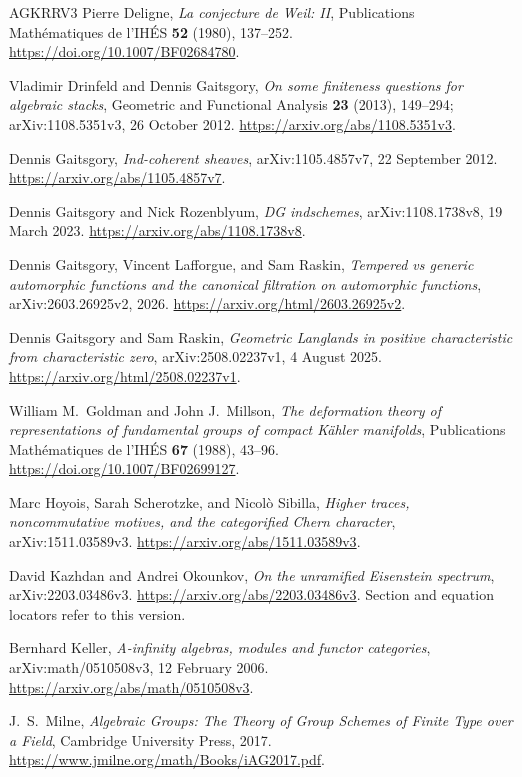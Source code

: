 \begin{thebibliography}{AGKRRV3}
Pierre Deligne,
\emph{La conjecture de Weil: II},
Publications Math\'ematiques de l'IH\'ES \textbf{52} (1980), 137--252.
\url{https://doi.org/10.1007/BF02684780}.


Vladimir Drinfeld and Dennis Gaitsgory,
\emph{On some finiteness questions for algebraic stacks},
Geometric and Functional Analysis \textbf{23} (2013), 149--294;
arXiv:1108.5351v3, 26 October 2012.
\url{https://arxiv.org/abs/1108.5351v3}.

Dennis Gaitsgory,
\emph{Ind-coherent sheaves},
arXiv:1105.4857v7, 22 September 2012.
\url{https://arxiv.org/abs/1105.4857v7}.

Dennis Gaitsgory and Nick Rozenblyum,
\emph{DG indschemes},
arXiv:1108.1738v8, 19 March 2023.
\url{https://arxiv.org/abs/1108.1738v8}.

Dennis Gaitsgory, Vincent Lafforgue, and Sam Raskin,
\emph{Tempered vs generic automorphic functions and the canonical
filtration on automorphic functions},
arXiv:2603.26925v2, 2026.
\url{https://arxiv.org/html/2603.26925v2}.

Dennis Gaitsgory and Sam Raskin,
\emph{Geometric Langlands in positive characteristic from characteristic zero},
arXiv:2508.02237v1, 4 August 2025.
\url{https://arxiv.org/html/2508.02237v1}.

William M.~Goldman and John J.~Millson,
\emph{The deformation theory of representations of fundamental groups of
compact K\"ahler manifolds},
Publications Math\'ematiques de l'IH\'ES \textbf{67} (1988), 43--96.
\url{https://doi.org/10.1007/BF02699127}.

Marc Hoyois, Sarah Scherotzke, and Nicol\`o Sibilla,
\emph{Higher traces, noncommutative motives, and the categorified Chern
character},
arXiv:1511.03589v3.
\url{https://arxiv.org/abs/1511.03589v3}.

David Kazhdan and Andrei Okounkov,
\emph{On the unramified Eisenstein spectrum},
arXiv:2203.03486v3.
\url{https://arxiv.org/abs/2203.03486v3}.
Section and equation locators refer to this version.

Bernhard Keller,
\emph{A-infinity algebras, modules and functor categories},
arXiv:math/0510508v3, 12 February 2006.
\url{https://arxiv.org/abs/math/0510508v3}.

J.~S.~Milne,
\emph{Algebraic Groups: The Theory of Group Schemes of Finite Type over a
Field},
Cambridge University Press, 2017.
\url{https://www.jmilne.org/math/Books/iAG2017.pdf}.


\end{thebibliography}
